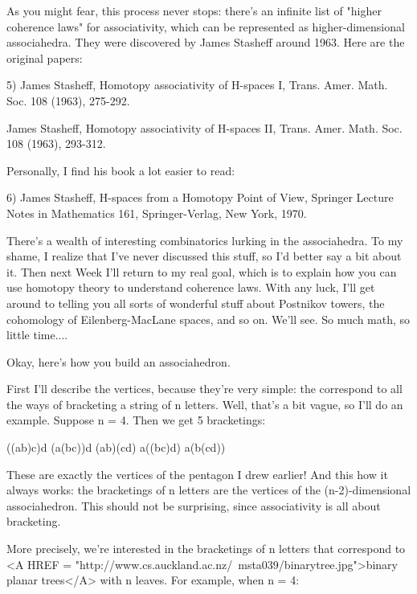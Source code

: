 As you might fear, this process never stops: there's an infinite list of
"higher coherence laws" for associativity, which can be
represented as higher-dimensional associahedra.  They were discovered by
James Stasheff around 1963.  Here are the original papers:

5) James Stasheff, Homotopy associativity of H-spaces I, Trans. Amer.
Math. Soc. 108 (1963), 275-292.

James Stasheff, Homotopy associativity of H-spaces II, Trans. Amer.
Math. Soc. 108 (1963), 293-312.

Personally, I find his book a lot easier to read:

6) James Stasheff, H-spaces from a Homotopy Point of View, Springer
Lecture Notes in Mathematics 161, Springer-Verlag, New York, 1970.

There's a wealth of interesting combinatorics lurking in the 
associahedra.  To my shame, I realize that I've never discussed this
stuff, so I'd better say a bit about it.  Then next Week I'll return 
to my real goal, which is to explain how you can use homotopy theory 
to understand coherence laws.   With any luck, I'll get around to
telling you all sorts of wonderful stuff about Postnikov towers, the
cohomology of Eilenberg-MacLane spaces, and so on.  We'll see.  So much
math, so little time....

Okay, here's how you build an associahedron.  

First I'll describe the vertices, because they're very simple: the
correspond to all the ways of bracketing a string of n letters.  Well, 
that's a bit vague, so I'll do an example.  Suppose n = 4.  Then we get 
5 bracketings:

((ab)c)d
(a(bc))d
(ab)(cd)
a((bc)d)
a(b(cd))

These are exactly the vertices of the pentagon I drew earlier!  And
this how it always works: the bracketings of n letters are the vertices 
of the (n-2)-dimensional associahedron.  This should not be surprising, 
since associativity is all about bracketing.

More precisely, we're interested in the bracketings of n letters that
correspond to <A HREF = "http://www.cs.auckland.ac.nz/~msta039/binarytree.jpg">binary planar trees</A> with n leaves.  For example, when 
n = 4:

